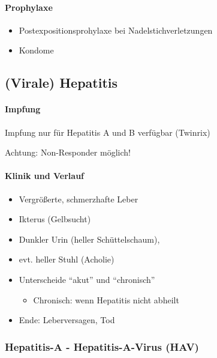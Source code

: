 \paragraph{Prophylaxe}

\begin{itemize}
    \item Postexpositionsprohylaxe bei Nadelstichverletzungen
    \item Kondome
\end{itemize}



\subsection{(Virale)
Hepatitis}\label{topic:hepatitis-virale}


\paragraph{Impfung}Impfung nur f\"ur Hepatitis A und B
verf\"ugbar (Twinrix{\texttrademark})

Achtung: Non-Responder m\"oglich!

\paragraph{Klinik und Verlauf}

\begin{itemize}
    \item Vergr\"o{\ss}erte, schmerzhafte Leber
    \item Ikterus (Gelbsucht)
    \item Dunkler Urin (heller Sch\"uttelschaum),
    \item evt. heller Stuhl (Acholie)
    \item Unterscheide {\textquotedblleft}akut{\textquotedblright} und
    {\textquotedblleft}chronisch{\textquotedblright}
    \begin{itemize}
        \item Chronisch: wenn Hepatitis nicht abheilt
    \end{itemize}
    \item Ende: Leberversagen, Tod
\end{itemize}

\subsubsection{Hepatitis-A - Hepatitis-A-Virus (HAV)}

